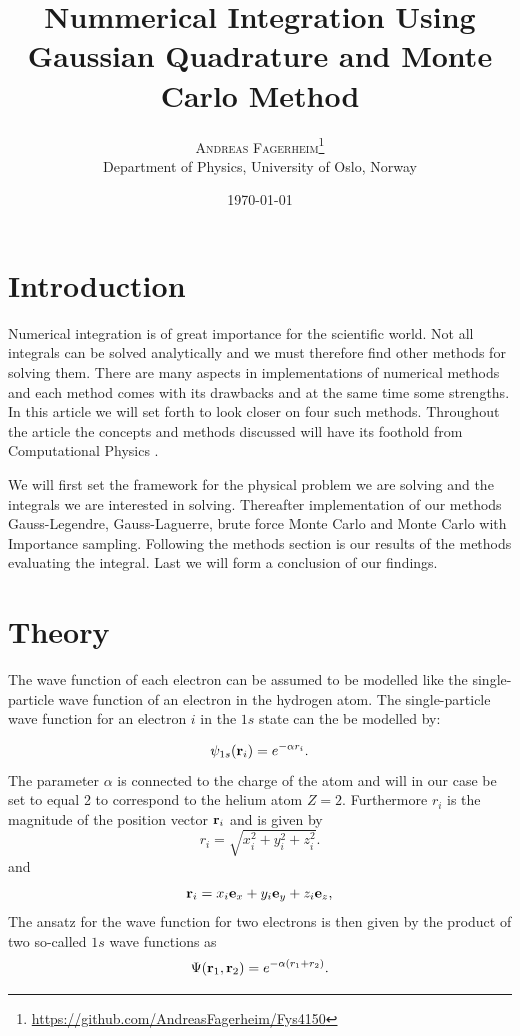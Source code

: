 \documentclass[twoside,twocolumn]{article}
\title{Nummerical Integration Using Gaussian Quadrature and Monte Carlo Method } %
\author{%
\textsc{Andreas Fagerheim}\thanks{\url{https://github.com/AndreasFagerheim/Fys4150}} \\[1ex] %
\normalsize Department of Physics, University of Oslo, Norway \\ %
}
\date{\today} %
\begin{document}
\maketitle


\section{Introduction}
Numerical integration is of great importance for the scientific world. Not all integrals can be solved analytically and we must therefore find other methods for solving them. There are many aspects in implementations of numerical methods and each method comes with its drawbacks and at the same time some strengths. In this article we will set forth to look closer on four such methods. Throughout the article the concepts and methods discussed will have its foothold from Computational Physics \cite{Hjorth-Jensen:2015dg}.

We will first set the framework for the physical problem we are solving and the integrals we are interested in solving. Thereafter implementation of our methods Gauss-Legendre, Gauss-Laguerre, brute force Monte Carlo and Monte Carlo with Importance sampling. Following the methods section is our results of the methods evaluating the integral. Last we will form a conclusion of our findings.
\section{Theory}

The wave function of each electron can be assumed to be modelled like
the single-particle wave function of an electron in the hydrogen
atom. The single-particle wave function for an electron $i$ in the
$1s$ state can the be modelled by:



\begin{equation}
		\psi_{1s}({\bf r}_i)  =   e^{-\alpha r_i}.
\end{equation}
The parameter $\alpha$ is connected to the charge of the atom and will in our case be set to equal 2 to correspond to the helium atom $Z = 2$. Furthermore $r_i$ is the magnitude of the position vector ${\bf r}_i$ and is given by
\[
r_i = \sqrt{x_i^2+y_i^2+z_i^2}.
\]
and
\[
   {\bf r}_i =  x_i {\bf e}_x + y_i {\bf e}_y +z_i {\bf e}_z ,
\]
The ansatz for the wave function for two electrons is then given by the product of two 
so-called 
$1s$ wave functions as 
\[
   \Psi({\bf r}_1,{\bf r}_2)  =   e^{-\alpha (r_1+r_2)}.
\]
\end{document}
